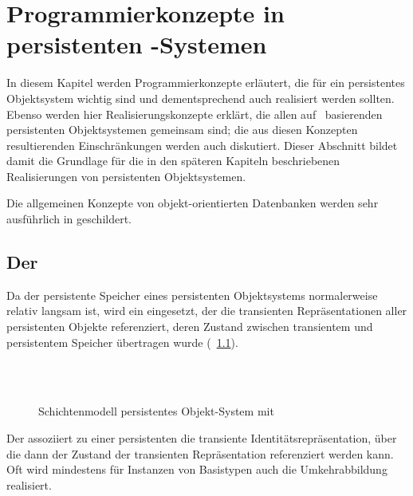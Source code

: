 %
\chapter{Pro\-gram\-mier\-kon\-zep\-te in persistenten
\protect\clos-Systemen}%
\label{chap:cltodb}%
%
In diesem Kapitel werden Programmierkonzepte erl\"{a}utert, die
f\"{u}r ein persistentes Objektsystem wichtig sind und dementsprechend
auch realisiert werden sollten. Ebenso werden hier
Realisierungskonzepte erkl\"{a}rt, die allen auf \clos\ basierenden
persistenten Objektsystemen gemeinsam sind; die aus diesen Konzepten
resultierenden Einschr\"{a}nkungen werden auch diskutiert. Dieser
Abschnitt bildet damit die Grundlage f\"{u}r die in den
sp\"{a}teren Kapiteln beschriebenen Realisierungen von persistenten
Objektsystemen.
%
\par{}Die allgemeinen Konzepte von objekt-orientierten Datenbanken
werden sehr ausf\"{u}hrlich in \cite[]{bib:zd90}
geschildert.
%
\section{Der \protect\cache}
%
Da der persistente Speicher eines persistenten Objektsystems
normalerweise relativ langsam ist, wird ein \cache\/ eingesetzt, der
die transienten Repr\"{a}sentationen aller persistenten Objekte
referenziert, deren Zustand zwischen transientem und persistentem
Speicher \"{u}bertragen wurde (\figurename~\ref{fig:pocache}).
%
\begin{figure}[htbp]
%
\centering\parbox{\oshwidth}{\centering%
\\[\medskipamount]
%
\\[\medskipamount]
%
}%
\caption{Schichtenmodell persistentes Objekt-System mit
\protect\cache}%
\label{fig:pocache}
\end{figure}
%
Der \cache\/ assoziiert zu einer persistenten die transiente
Identit\"{a}tsrepr\"{a}sentation, \"{u}ber die dann der Zustand der transienten
Repr\"{a}sentation referenziert werden kann. Oft wird mindestens f\"{u}r
Instanzen von Basistypen auch die Umkehrabbildung realisiert.
%
